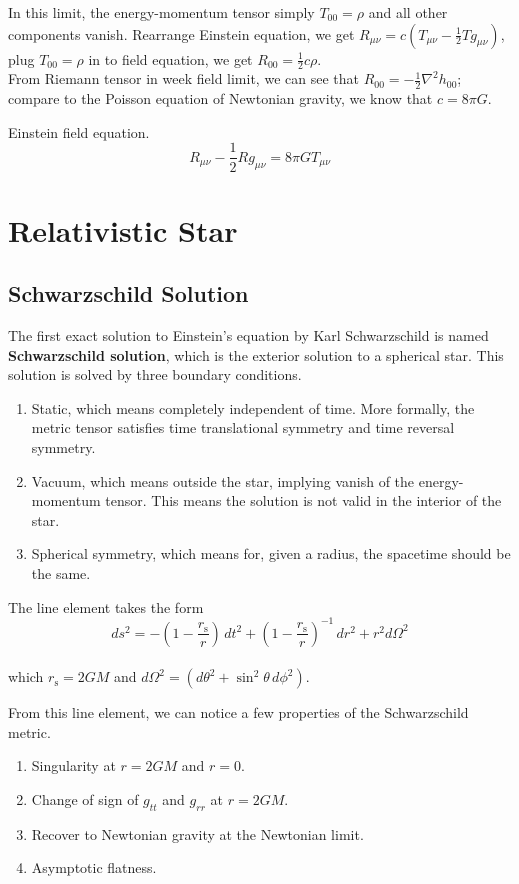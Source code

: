 \documentclass[12pt]{article}
\theoremstyle{mystyle}{\newtheorem{definition}{Definition}[section]}
\theoremstyle{mystyle}{\newtheorem{theorem}[definition]{Theorem}}
\theoremstyle{mystyle}{\newtheorem*{remark}{Remark}}
\theoremstyle{mystyle}{\newtheorem*{example}{Example}}
\theoremstyle{mystyle}{\newtheorem*{examples}{Examples}}
\theoremstyle{cstyle}{\newtheorem*{cthm}{}}
\begin{document}
In this limit, the energy-momentum tensor simply \(T_{00} = \rho\) and all other components vanish.
Rearrange Einstein equation, we get \(R_{\mu\nu} = c\left( T_{\mu\nu} - \frac{1}{2}Tg_{\mu\nu} \right)\),
plug \(T_{00} = \rho\) in to field equation, we get \(R_{00}=\frac{1}{2}c\rho\). \\
From Riemann tensor in week field limit, we can see that \(R_{00}=-\frac{1}{2}\nabla^2 h_{00}\);
compare to the Poisson equation of Newtonian gravity, we know that \(c = 8\pi G\).
\begin{cthm}
  Einstein field equation.
  \[R_{\mu\nu} -\frac{1}{2}Rg_{\mu\nu} = 8\pi GT_{\mu\nu}\]
\end{cthm}

\section{Relativistic Star}

\subsection{Schwarzschild Solution}

The first exact solution to Einstein's equation by Karl Schwarzschild is named \textbf{Schwarzschild solution},
which is the exterior solution to a spherical star.
This solution is solved by three boundary conditions.

\begin{enumerate}
  \item Static, which means completely independent of time. More formally, the metric tensor satisfies time translational symmetry and time reversal symmetry.
  \item Vacuum, which means outside the star, implying vanish of the energy-momentum tensor. This means the solution is not valid in the interior of the star.
  \item Spherical symmetry, which means for, given a radius, the spacetime should be the same.
\end{enumerate}

\begin{cthm}
  The line element takes the form
  \[ds^2 = -\left(1 - \frac{r_\mathrm{s}}{r} \right)\,dt^2 + \left(1-\frac{r_\mathrm{s}}{r}\right)^{-1} \,dr^2 + r^2 d\Omega^2\]\\
  which \(r_\mathrm{s} = 2GM\) and \(d\Omega^2 = \left(d\theta^2 + \sin^2\theta \, d\phi^2\right)\).
\end{cthm}
From this line element, we can notice a few properties of the Schwarzschild metric.
\begin{enumerate}
  \item Singularity at \(r = 2GM\) and \(r = 0\).
  \item Change of sign of \(g_{tt}\) and \(g_{rr}\) at \(r = 2GM\).
  \item Recover to Newtonian gravity at the Newtonian limit.
  \item Asymptotic flatness.
\end{enumerate}
\end{document}
